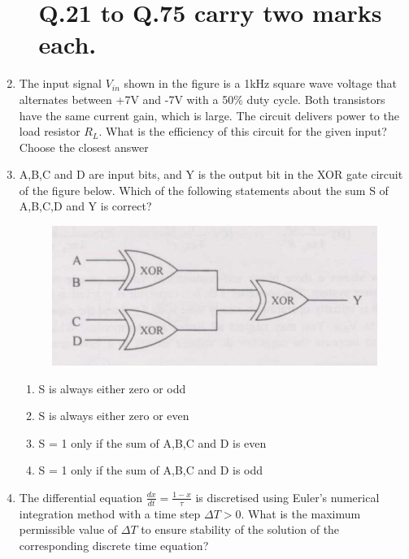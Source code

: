 \documentclass[journal]{IEEEtran}
\begin{document}
\begin{enumerate}
\begin{enumerate}
\section*{Q.21 to Q.75 carry two marks each.}
\end{enumerate}
\bigskip
\item The input signal $V_{in}$ shown in the figure is a 1kHz square wave voltage that alternates between +7V and -7V with a 50\% duty cycle. Both transistors have the same current gain, which is large. The circuit delivers power to the load resistor $R_L$. What is the efficiency of this circuit for the given input? Choose the closest answer

\begin{figure}[H]
   \centering
   
   \caption{}
   \label{25}
\end{figure}

\begin{enumerate}
\end{enumerate}
\bigskip
\item A,B,C and D are input bits, and Y is the output bit in the XOR gate circuit of the figure below. Which of the following statements about the sum S of A,B,C,D and Y is correct?
\begin{figure}[H]
   \centering
   \includegraphics[width=0.7\linewidth]{figs/fig_3.png}
   \label{stemplot}
\end{figure}
\begin{enumerate}
        \item S is always either zero or odd
        \item S is always either zero or even
        \item S = 1 only if the sum of A,B,C and D is even 
        \item S = 1 only if the sum of A,B,C and D is odd
\end{enumerate}
\bigskip
\item The differential equation $\frac{dx}{dt}=\frac{1-x}{\tau}$ is discretised using Euler's numerical integration method with a time step $\Delta T > 0$. What is the maximum permissible value of $\Delta T$ to ensure stability of the solution of the corresponding discrete time equation?


\end{enumerate}
\end{document}
